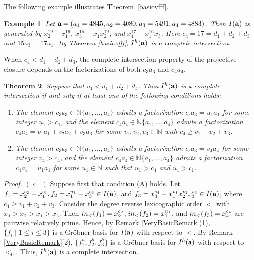 \documentclass[10pt,a4paper]{amsart}
\newtheorem{thm1}{Theorem}[section]
\newtheorem{ex1}[thm1]{Example}
\begin{document}
The following example illustrates Theorem~\ref{basicvfff}.

\begin{ex1} {\rm Let ${\bf a}=(a_{1}=4845,a_2=4080,a_3=5491,a_{4}=4883)$. Then $I({\bf a})$ is generated by $x_{2}^{19}-x_{1}^{16}$, $x_{3}^{15}-x_{1}x_{2}^{19}$, and $x_{4}^{17}-x_{1}^{16}x_{3}$. Here $c_4=17=d_1+d_2+d_3$ and $15a_3=17a_1 $. By Theorem \ref{basicvfff}, $I^{h}({\bf a})$ is a complete intersection.}
\end{ex1}

When $c_4<d_1+d_2+d_3$, the complete intersection property of the projective closure depends on the factorizations of both $c_3a_3$ and $c_4a_4$.

\begin{thm1} \label{Basic24} Suppose that $c_4<d_1+d_2+d_3$. Then $I^{h}({\bf a})$ is a complete intersection if and only if at least one of the following conditions holds: \begin{enumerate} \item[(A)] The element $c_{3}a_3 \in \mathbb{N}\{a_1,\ldots,a_4\}$ admits a factorization $c_{3}a_3=u_1a_{1}$ for some integer $u_{1}>c_1$, and the element $c_{4}a_4 \in \mathbb{N}\{a_1,\ldots,a_4\}$ admits a factorization $c_{4}a_4=v_1a_{1}+v_2a_{2}+v_3a_3$ for some $v_1, v_2, v_3 \in \mathbb{N}$ with $c_4 \geq v_1+v_2+v_3$.
\item[(B)] The element $c_{3}a_3 \in \mathbb{N}\{a_1,\ldots,a_4\}$ admits a factorization $c_{3}a_3=v_4a_{4}$ for some integer $v_{4}>c_4$, and the element $c_{4}a_4 \in \mathbb{N}\{a_1,\ldots,a_4\}$ admits a factorization $c_{4}a_4=u_1a_{1}$ for some $u_1 \in \mathbb{N}$ such that $u_1>c_4$ and $u_1>c_1$.
\end{enumerate}
\end{thm1}
{\em \noindent Proof.} $(\Leftarrow)$ Suppose first that condition (A) holds. Let $f_{1}=x_{2}^{c_2}-x_{1}^{c_1}, f_{2}=x_{1}^{u_1}-x_{3}^{c_3} \in I({\bf a})$, and $f_{3}=x_{4}^{c_4}-x_{1}^{v_1}x_{2}^{v_2}x_{3}^{v_3} \in I({\bf a})$, where $c_{4} \geq v_1+v_{2}+v_{3}$. Consider the degree reverse lexicographic order $<$ with $x_4>x_2>x_1>x_3$. Then ${\rm in}_{<}(f_{1})=x_{2}^{c_2}$, ${\rm in}_{<}(f_{2})=x_{1}^{u_1}$, and ${\rm in}_{<}(f_{3})=x_{4}^{c_4}$ are pairwise relatively prime. Hence, by Remark \ref{VeryBasicRemark}(1), $\{f_{i} \mid 1 \leq i \leq 3\}$ is a Gr\"obner basis for $I({\bf a})$ with respect to $<$. By Remark \ref{VeryBasicRemark}(2), $\{f_1^h,f_2^h,f_3^h\}$ is a Gr\"obner basis for $I^{h}({\bf a})$ with respect to $<_{0}$. Thus, $I^{h}({\bf a})$ is a complete intersection. 
\end{document}
